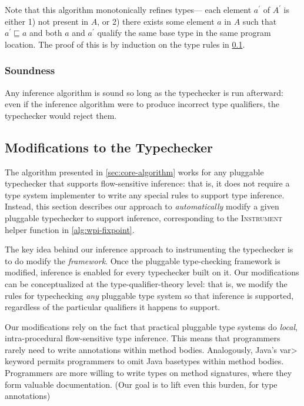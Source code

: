 
Note that this algorithm monotonically refines types---\ie
each element $a^{\prime}$ of $A^{\prime}$ is either 1) not present in $A$, or
2) there exists some element $a$ in $A$ such that $a^{\prime} \sqsubseteq a$
and both $a$ and $a^{\prime}$ qualify the same base type in the same program location.
The proof of this is by induction on the type rules in \cref{sec:instrument}.

\subsubsection{Soundness}
\label{sec:soundness}

Any inference algorithm is sound so long as the typechecker is run afterward:
even if the inference algorithm were to produce incorrect type qualifiers,
the typechecker would reject them.

\subsection{Modifications to the Typechecker}
\label{sec:instrument}

The algorithm presented in \cref{sec:core-algorithm} works for
any pluggable typechecker that supports flow-sensitive inference:
that is, it does not require a type system implementer to write
any special rules to support type inference. Instead, this section
describes our approach to \emph{automatically} modify a given
pluggable typechecker to support inference, corresponding to the
\textsc{Instrument} helper function in \cref{alg:wpi-fixpoint}.

The key idea behind our inference approach to instrumenting the typechecker
is to do modify the \emph{framework}.  Once the pluggable type-checking
framework is modified, inference is enabled for every typechecker built on it.
Our modifications
can be conceptualized at the type-qualifier-theory level: that is,
we modify the rules for typechecking \emph{any} pluggable type system
so that inference is supported,
regardless of the particular qualifiers it happens to support.

Our modifications rely on the fact that practical pluggable type systems
do \emph{local}, intra-procedural flow-sensitive type inference.
This means that programmers rarely need to write annotations within method bodies.
Analogously, Java's \<var> keyword permits programmers to omit Java basetypes within
method bodies.
Programmers are more willing to write types on method
signatures, where they form valuable documentation.  (Our goal is to lift
even this burden, for type annotations)

